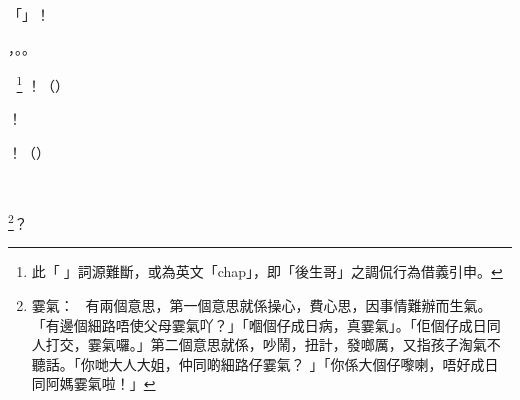 \begin{dialogue}
「」！
\end{dialogue}
\begin{dialogue}
，。。
\end{dialogue}
\begin{dialogue}
󶰆
\footnote{ 此「」詞源難斷，或為英文「chap」，即「後生哥」之調侃行為借義引申。
}
！（）
\end{dialogue}
\begin{dialogue}
！
\end{dialogue}
\begin{dialogue}
！（）
\end{dialogue}
\begin{dialogue}
！，！，！
\end{dialogue}
\begin{dialogue}
\footnote{霎氣：󱎅󱫢，有兩個意思，第一個意思就係操心，費心思，因事情難辦而生氣。「有邊個細路唔使父母霎氣吖？」「嗰個仔成日病，真霎氣」。「佢個仔成日同人打交，霎氣囉。」第二個意思就係，吵鬧，扭計，發啷厲，又指孩子淘氣不聽話。「你哋大人大姐，仲同啲細路仔霎氣？	」「你係大個仔嚟喇，唔好成日同阿媽霎氣啦！」
}？
\end{dialogue}
